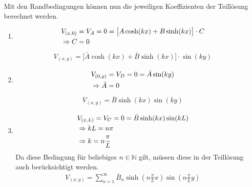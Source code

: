 Mit den Randbedingungen können nun die jeweiligen Koeffizienten der Teillösung berechnet werden. 

\begin{enumerate}
	\item \begin{align}
		&V_{(x,0)} = V_A = 0 = \bigl[A \cosh(kx) + B \sinh(kx) \bigr] \cdot C \\
		&\Rightarrow C = 0 \notag
	\end{align}
	\begin{align}
		V_{(x,y)} = \bigl[ \bar{A} \cosh(kx) + \bar{B} \sinh(kx) \bigr] \cdot \sin(ky)
	\end{align}
	
	\item \begin{align}
		&V_{(0,y)} = V_D = 0 = \bar{A} \sin(ky) \\
		&\Rightarrow \bar{A} = 0 \notag
	\end{align}
	\begin{align}
		V_{(x,y)} = \bar{B} \sinh(kx) \sin(ky)
	\end{align}
	
	\item \begin{align}
		&V_{(x,L)} = V_C = 0 = \bar{B} \sinh(kx) \sin(kL) \\
		&\Rightarrow kL = n\pi \notag \\
		&\Rightarrow k = n \frac{\pi}{L} \notag
	\end{align}
	Da diese Bedingung für beliebiges $n \in \mathbb{N}$ gilt, müssen diese in der Teillösung auch berücksichtigt werden. 
	\begin{align}
		V_{(x,y)} = \sum_{n=1}^\infty \bar{B}_n \sinh(n \frac{\pi}{L}x) \sin(n \frac{\pi}{L}y)
	\end{align}
	

\end{enumerate}
